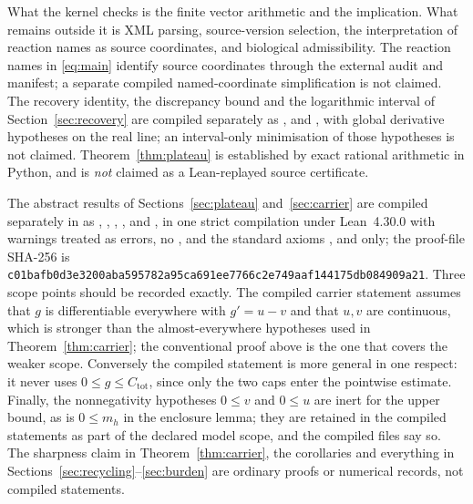 \documentclass[11pt,a4paper]{article}
\newcommand{\hashfour}[4]{\texttt{#1\allowbreak#2\allowbreak#3\allowbreak#4}}
\theoremstyle{plain}
\theoremstyle{definition}
\theoremstyle{remark}
\newcommand{\Ctot}{C_{\mathrm{tot}}}
\begin{document}
What the kernel checks is the finite vector arithmetic and the implication.
What remains outside it is XML parsing, source-version selection, the
interpretation of reaction names as source coordinates, and biological
admissibility. The reaction names in \eqref{eq:main} identify source
coordinates through the external audit and manifest; a separate compiled
named-coordinate simplification is not claimed. The recovery identity, the
discrepancy bound and the logarithmic interval of Section~\ref{sec:recovery}
are compiled separately as
,
 and , with global
derivative hypotheses on the real line; an interval-only minimisation of those
hypotheses is not claimed. Theorem~\ref{thm:plateau} is established by exact rational arithmetic in
Python, and is \emph{not} claimed as a Lean-replayed source certificate.

The abstract results of Sections~\ref{sec:plateau} and~\ref{sec:carrier} are
compiled separately in  as
, , ,
,  and
, in one strict compilation under Lean~4.30.0
with warnings treated as errors, no , and the standard axioms
,  and  only; the
proof-file SHA-256 is
\hashfour{c01bafb0d3e3200a}{ba595782a95ca691}{ee7766c2e749aaf1}{44175db084909a21}. Three
scope points should be recorded exactly. The compiled carrier statement assumes
that $g$ is differentiable everywhere with $g'=u-v$ and that $u,v$ are
continuous, which is stronger than the almost-everywhere hypotheses used in
Theorem~\ref{thm:carrier}; the conventional proof above is the one that covers
the weaker scope. Conversely the compiled statement is more general in one
respect: it never uses $0\le g\le\Ctot$, since only the two caps enter the
pointwise estimate. Finally, the nonnegativity hypotheses $0\le v$ and $0\le u$
are inert for the upper bound, as is $0\le m_h$ in the enclosure lemma; they
are retained in the compiled statements as part of the declared model scope,
and the compiled files say so. The sharpness claim in
Theorem~\ref{thm:carrier}, the corollaries and everything in
Sections~\ref{sec:recycling}--\ref{sec:burden} are ordinary proofs or numerical
records, not compiled statements.
\end{document}
